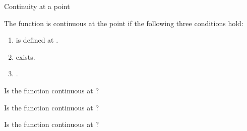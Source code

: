 \begin{EMunit}


\end{EMunit}

\EMhold


\begin{EMdefinition}{Continuity at a point}

The function  is continuous at the point  if the following three conditions hold:

\begin{enumerate}
\def\labelenumi{\arabic{enumi}.}
\tightlist
\item
   is defined at .
\item
   exists.
\item
  .
\end{enumerate}

\end{EMdefinition}

\begin{EMexample}{}

Is the function  continuous at ?

\end{EMexample}

\begin{EMexample}{}

Is the function
continuous at ?

\end{EMexample}

\begin{EMexample}{}

Is the function
continuous at ?

\end{EMexample}

